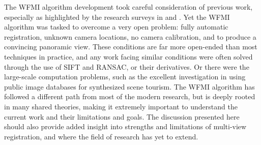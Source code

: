    The WFMI algorithm development took careful consideration of previous work, especially as highlighted by the research surveys in \cite{Zitova2003} and \cite{Pluim2003}. Yet the WFMI algorithm was tasked to overcome a very open problem: fully automatic registration, unknown camera locations, no camera calibration, and to produce a convincing panoramic view. These conditions are far more open-ended than most techniques in practice, and any work facing similar conditions were often solved through the use of SIFT and RANSAC, or their derivatives. Or there were the large-scale computation problems, such as the excellent investigation in \cite{Snavely2008} using public image databases for synthesized scene tourism. The WFMI algorithm has followed a different path from most of the modern research, but is deeply rooted in many shared theories, making it extremely important to understand the current work and their limitations and goals. The discussion presented here should also provide added insight into strengths and limitations of multi-view registration, and where the field of research has yet to extend.
 
 


